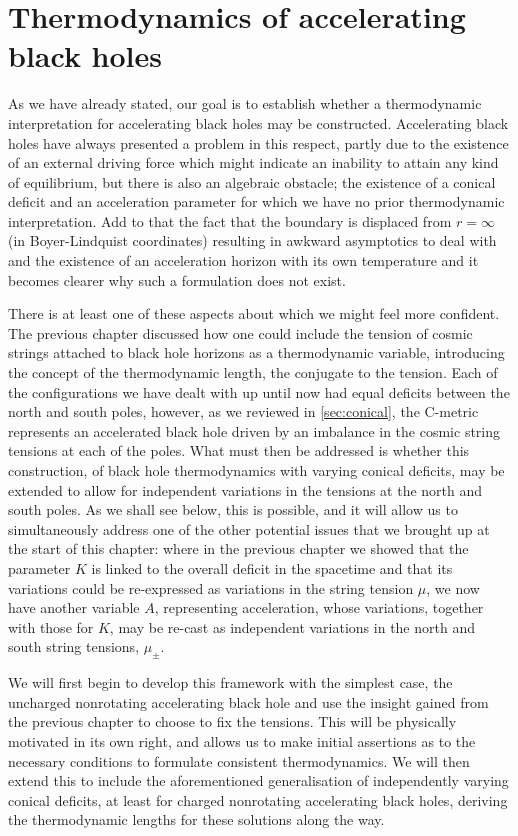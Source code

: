 \documentclass[
twoside,
openright,
frontopenright,
]{dmathesis}
\begin{document}
\chapter{Thermodynamics of accelerating black holes}
\label{cha:therm-accel-black}

As we have already stated, our goal is to establish whether a thermodynamic
interpretation for accelerating black holes may be constructed. Accelerating
black holes have always presented a problem in this respect, partly due to the
existence of an external driving force which might indicate an inability to
attain any kind of equilibrium, but there is also an algebraic obstacle; the
existence of a conical deficit and an acceleration parameter for which we have
no prior thermodynamic interpretation. Add to that the fact that the boundary is
displaced from $r = \infty$ (in Boyer-Lindquist coordinates) resulting in
awkward asymptotics to deal with and the existence of an acceleration horizon
with its own temperature and it becomes clearer why such a formulation does not
exist.

There is at least one of these aspects about which we might feel more
confident. The previous chapter discussed how one could include the tension of
cosmic strings attached to black hole horizons as a thermodynamic variable,
introducing the concept of the thermodynamic length, the conjugate to the
tension. Each of the configurations we have dealt with up until now had equal
deficits between the north and south poles, however, as we reviewed in
\cref{sec:conical}, the C-metric represents an accelerated black hole driven by
an imbalance in the cosmic string tensions at each of the poles. What must then
be addressed is whether this construction, of black hole thermodynamics with
varying conical deficits, may be extended to allow for independent variations in
the tensions at the north and south poles. As we shall see below, this is
possible, and it will allow us to simultaneously address one of the other
potential issues that we brought up at the start of this chapter: where in the
previous chapter we showed that the parameter $K$ is linked to the overall
deficit in the spacetime and that its variations could be re-expressed as
variations in the string tension $\mu$, we now have another variable $A$,
representing acceleration, whose variations, together with those for $K$, may be
re-cast as independent variations in the north and south string tensions,
$\mu_\pm$.

We will first begin to develop this framework with the simplest case, the
uncharged nonrotating accelerating black hole and use the insight gained from
the previous chapter to choose to fix the tensions. This will be physically
motivated in its own right, and allows us to make initial assertions as to the
necessary conditions to formulate consistent thermodynamics. We will then extend
this to include the aforementioned generalisation of independently varying
conical deficits, at least for charged nonrotating accelerating black holes,
deriving the thermodynamic lengths for these solutions along the way.
\end{document}
